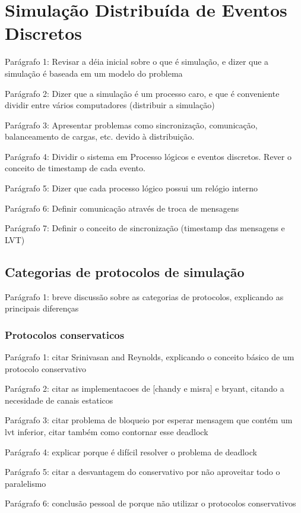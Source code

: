 \chapter{Simulação Distribuída de Eventos Discretos}

Parágrafo 1: Revisar a déia inicial sobre o que é simulação, e dizer que a simulação é baseada em um modelo do problema

Parágrafo 2: Dizer que a simulação é um processo caro, e que é conveniente dividir entre vários computadores (distribuir a simulação)

Parágrafo 3: Apresentar problemas como sincronização, comunicação, balanceamento de cargas, etc. devido à distribuição.

Parágrafo 4: Dividir o sistema em Processo lógicos e eventos discretos. Rever o conceito de timestamp de cada evento.

Parágrafo 5: Dizer que cada processo lógico possui um relógio interno

Parágrafo 6: Definir comunicação através de troca de mensagens

Parágrafo 7: Definir o conceito de sincronização (timestamp das mensagens e LVT)


\section{Categorias de protocolos de simulação}

Parágrafo 1: breve discussão sobre as categorias de protocolos, explicando as principais diferenças

\subsection{Protocolos conservaticos}

Parágrafo 1: citar Srinivasan and Reynolds, explicando o conceito básico de um protocolo conservativo

Parágrafo 2: citar as implementacoes de [chandy e misra] e bryant, citando a necesidade de canais estaticos

Parágrafo 3: citar problema de bloqueio por esperar mensagem que contém um lvt inferior, citar também como contornar esse deadlock

Parágrafo 4: explicar porque é difícil resolver o problema de deadlock

Parágrafo 5: citar a desvantagem do conservativo por não aproveitar todo o paralelismo

Parágrafo 6: conclusão pessoal de porque não utilizar o protocolos conservativos

